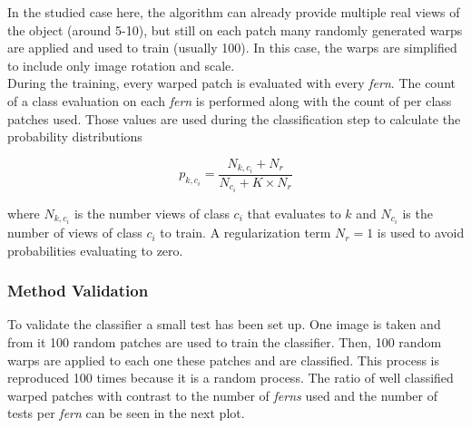 In the studied case here, the algorithm can already provide multiple real views of the object (around 5-10), but still on each patch many randomly generated warps are applied and used to train (usually 100). In this case, the warps are simplified to include only image rotation and scale.\\

During the training, every warped patch is evaluated with every \textit{fern}. The count of a class evaluation on each \textit{fern} is performed along with the count of per class patches used. Those values are used during the classification step to calculate the probability distributions

\begin{equation}
  p_{k,c_i} = \frac{N_{k,c_i} + N_r}{N_{c_i} + K \times N_r}
\end{equation}

where $N_{k,c_i}$ is the number views of class $c_i$ that evaluates to $k$ and $N_{c_i}$ is the number of views of class $c_i$ to train. A regularization term $N_r = 1$ is used to avoid probabilities evaluating to zero.\\


\subsubsection{Method Validation}
\label{ssub:ferns_method_validation}

To validate the classifier a small test has been set up. One image is taken and from it 100 random patches are used to train the classifier. Then, 100 random warps are applied to each one these patches and are classified. This process is reproduced 100 times because it is a random process. The ratio of well classified warped patches with contrast to the number of \textit{ferns} used and the number of tests per \textit{fern} can be seen in the next plot.


